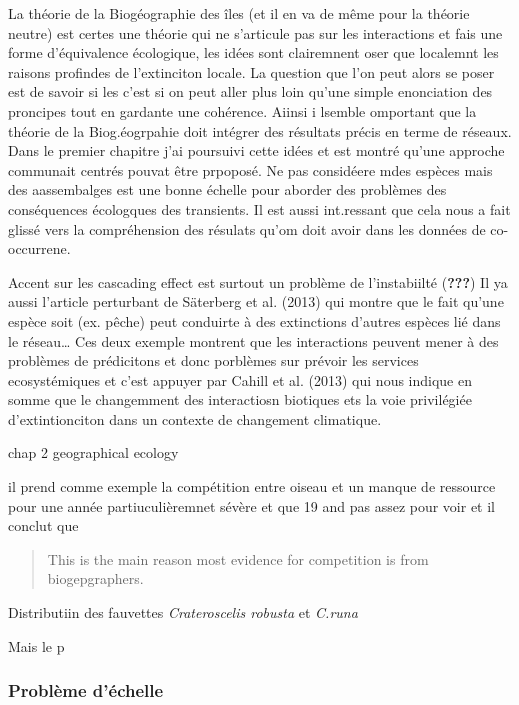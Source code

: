 La théorie de la Biogéographie des îles (et il en va de même pour la
théorie neutre) est certes une théorie qui ne s'articule pas sur les
interactions et fais une forme d'équivalence écologique, les idées sont
clairemnent oser que localemnt les raisons profindes de l'extinciton
locale. La question que l'on peut alors se poser est de savoir si les
c'est si on peut aller plus loin qu'une simple enonciation des proncipes
tout en gardante une cohérence. Aiinsi i lsemble omportant que la
théorie de la Biog.éogrpahie doit intégrer des résultats précis en terme
de réseaux. Dans le premier chapitre j'ai poursuivi cette idées et est
montré qu'une approche communait centrés pouvat être prpoposé. Ne pas
considéere mdes espèces mais des aassembalges est une bonne échelle pour
aborder des problèmes des conséquences écologques des transients. Il est
aussi int.ressant que cela nous a fait glissé vers la compréhension des
résulats qu'om doit avoir dans les données de co-occurrene.

Accent sur les cascading effect est surtout un problème de l'instabiilté
({\textbf{???}}) Il ya aussi l'article perturbant de Säterberg et al.
(2013) qui montre que le fait qu'une espèce soit (ex. pêche) peut
conduirte à des extinctions d'autres espèces lié dans le réseau\ldots{}
Ces deux exemple montrent que les interactions peuvent mener à des
problèmes de prédicitons et donc porblèmes sur prévoir les services
ecosystémiques et c'est appuyer par Cahill et al. (2013) qui nous
indique en somme que le changemment des interactiosn biotiques ets la
voie privilégiée d'extintionciton dans un contexte de changement
climatique.

chap 2 geographical ecology

il prend comme exemple la compétition entre oiseau et un manque de
ressource pour une année partiuculièremnet sévère et que 19 and pas
assez pour voir et il conclut que

\begin{quote}
This is the main reason most evidence for competition is from
biogepgraphers.
\end{quote}

Distributiin des fauvettes \emph{Crateroscelis robusta} et \emph{C.runa}

Mais le p

\subsubsection{Problème d'échelle}\label{probluxe8me-duxe9chelle}

